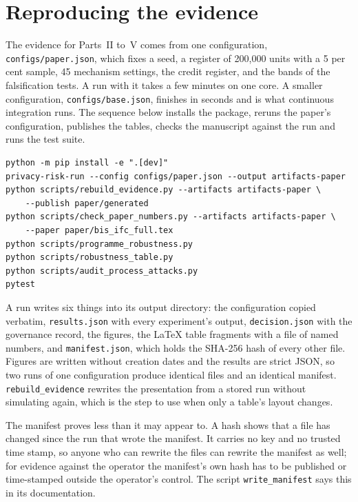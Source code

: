 \section{Reproducing the evidence}

The evidence for Parts~II to~V comes from one configuration, \texttt{configs/\allowbreak{}paper.\allowbreak{}json},
which fixes a seed, a register of 200{,}000 units with a 5 per cent sample, 45
mechanism settings, the credit register, and the bands of the falsification tests.
A run with it takes a few minutes on one core. A smaller configuration,
\texttt{configs/\allowbreak{}base.\allowbreak{}json}, finishes in seconds and is what continuous integration
runs. The sequence below installs the package, reruns the paper's configuration,
publishes the tables, checks the manuscript against the run and runs the test suite.

\begin{lstlisting}[language={}]
python -m pip install -e ".[dev]"
privacy-risk-run --config configs/paper.json --output artifacts-paper
python scripts/rebuild_evidence.py --artifacts artifacts-paper \
    --publish paper/generated
python scripts/check_paper_numbers.py --artifacts artifacts-paper \
    --paper paper/bis_ifc_full.tex
python scripts/programme_robustness.py
python scripts/robustness_table.py
python scripts/audit_process_attacks.py
pytest
\end{lstlisting}

A run writes six things into its output directory: the configuration copied verbatim,
\texttt{results.\allowbreak{}json} with every experiment's output, \texttt{decision.\allowbreak{}json} with the
governance record, the figures, the LaTeX table fragments with a file of named numbers,
and \texttt{manifest.\allowbreak{}json}, which holds the SHA-256 hash of every other file. Figures
are written without creation dates and the results are strict JSON, so two runs of one
configuration produce identical files and an identical manifest.
\texttt{rebuild\_\allowbreak{}evidence} rewrites the presentation from a stored run without
simulating again, which is the step to use when only a table's layout changes.

The manifest proves less than it may appear to. A hash shows that a file has changed
since the run that wrote the manifest. It carries no key and no trusted time stamp, so
anyone who can rewrite the files can rewrite the manifest as well; for evidence against
the operator the manifest's own hash has to be published or time-stamped outside the
operator's control. The script \texttt{write\_\allowbreak{}manifest} says this in its documentation.

